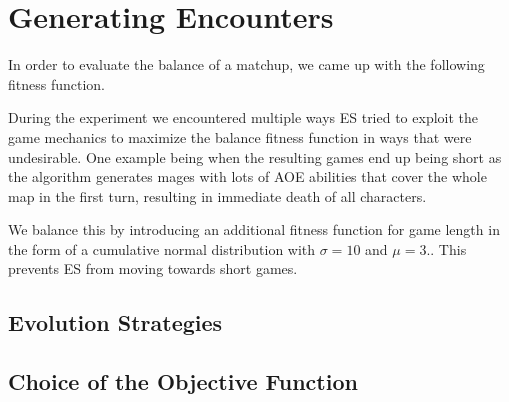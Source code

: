 \chapter{Generating Encounters}

In order to evaluate the balance of a matchup, we came up with the following fitness function.


During the experiment we encountered multiple ways ES tried to exploit the game
mechanics to maximize the balance fitness function in ways that were
undesirable. One example being when the resulting games end up being short as
the algorithm generates mages with lots of AOE abilities that cover the whole
map in the first turn, resulting in immediate death of all characters.

We balance this by introducing an additional fitness function for game length
in the form of a cumulative normal distribution with $\sigma = 10$ and $\mu =
3$..  This prevents ES from moving towards
short games.

\section{Evolution Strategies}

\section{Choice of the Objective Function}